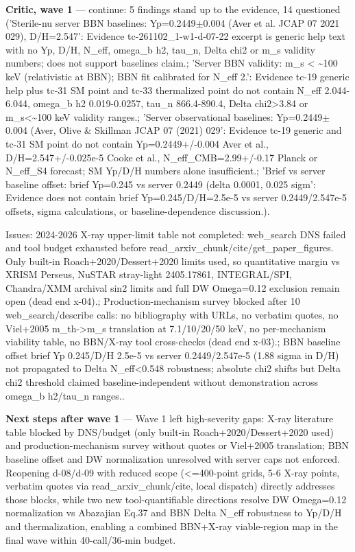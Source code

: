 \documentclass[11pt,a4paper]{article}
\begin{document}
\textbf{Critic, wave 1} --- continue: 5 findings stand up to the evidence, 14 questioned ('Sterile-nu server BBN baselines: Yp=0.2449$\pm$0.004 (Aver et al. JCAP 07 2021 029), D/H=2.547': Evidence tc-261102\_1-w1-d-07-22 excerpt is generic help text with no Yp, D/H, N\_eff, omega\_b h2, tau\_n, Delta chi2 or m\_s validity numbers; does not support baselines claim.; 'Server BBN validity: m\_s \textless{} \textasciitilde{}100 keV (relativistic at BBN); BBN fit calibrated for N\_eff 2.': Evidence tc-19 generic help plus tc-31 SM point and tc-33 thermalized point do not contain N\_eff 2.044-6.044, omega\_b h2 0.019-0.0257, tau\_n 866.4-890.4, Delta chi2\textgreater{}3.84 or m\_s\textless{}\textasciitilde{}100 keV validity ranges.; 'Server observational baselines: Yp=0.2449$\pm$0.004 (Aver, Olive \& Skillman JCAP 07 (2021) 029': Evidence tc-19 generic and tc-31 SM point do not contain Yp=0.2449+/-0.004 Aver et al., D/H=2.547+/-0.025e-5 Cooke et al., N\_eff\_CMB=2.99+/-0.17 Planck or N\_eff\_S4 forecast; SM Yp/D/H numbers alone insufficient.; 'Brief vs server baseline offset: brief Yp=0.245 vs server 0.2449 (delta 0.0001, 0.025 sigm': Evidence does not contain brief Yp=0.245/D/H=2.5e-5 vs server 0.2449/2.547e-5 offsets, sigma calculations, or baseline-dependence discussion.).

Issues: 2024-2026 X-ray upper-limit table not completed: web\_search DNS failed and tool budget exhausted before read\_arxiv\_chunk/cite/get\_paper\_figures. Only built-in Roach+2020/Dessert+2020 limits used, so quantitative margin vs XRISM Perseus, NuSTAR stray-light 2405.17861, INTEGRAL/SPI, Chandra/XMM archival sin2 limits and full DW Omega=0.12 exclusion remain open (dead end x-04).; Production-mechanism survey blocked after 10 web\_search/describe calls: no bibliography with URLs, no verbatim quotes, no Viel+2005 m\_th-\textgreater{}m\_s translation at 7.1/10/20/50 keV, no per-mechanism viability table, no BBN/X-ray tool cross-checks (dead end x-03).; BBN baseline offset brief Yp 0.245/D/H 2.5e-5 vs server 0.2449/2.547e-5 (1.88 sigma in D/H) not propagated to Delta N\_eff\textless{}0.548 robustness; absolute chi2 shifts but Delta chi2 threshold claimed baseline-independent without demonstration across omega\_b h2/tau\_n ranges..

\textbf{Next steps after wave 1} --- Wave 1 left high-severity gaps: X-ray literature table blocked by DNS/budget (only built-in Roach+2020/Dessert+2020 used) and production-mechanism survey without quotes or Viel+2005 translation; BBN baseline offset and DW normalization unresolved with server caps not enforced. Reopening d-08/d-09 with reduced scope (\textless{}=400-point grids, 5-6 X-ray points, verbatim quotes via read\_arxiv\_chunk/cite, local dispatch) directly addresses those blocks, while two new tool-quantifiable directions resolve DW Omega=0.12 normalization vs Abazajian Eq.37 and BBN Delta N\_eff robustness to Yp/D/H and thermalization, enabling a combined BBN+X-ray viable-region map in the final wave within 40-call/36-min budget.
\end{document}
